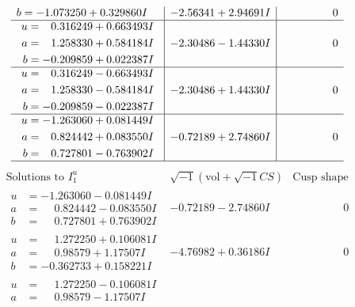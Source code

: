 \documentclass[1p]{elsarticle_modified}
\theoremstyle{definition}
\newcommand{\I}{\sqrt{-1}}
\begin{document}
$$\begin{array}{c|c|c}
\begin{aligned}
b &= -1.073250 + 0.329860 I\end{aligned}
 & -2.56341 + 2.94691 I & \phantom{-0.000000 } 0 \\ \hline\begin{aligned}
u &= \phantom{-}0.316249 + 0.663493 I \\
a &= \phantom{-}1.258330 + 0.584184 I \\
b &= -0.209859 + 0.022387 I\end{aligned}
 & -2.30486 - 1.44330 I & \phantom{-0.000000 } 0 \\ \hline\begin{aligned}
u &= \phantom{-}0.316249 - 0.663493 I \\
a &= \phantom{-}1.258330 - 0.584184 I \\
b &= -0.209859 - 0.022387 I\end{aligned}
 & -2.30486 + 1.44330 I & \phantom{-0.000000 } 0 \\ \hline\begin{aligned}
u &= -1.263060 + 0.081449 I \\
a &= \phantom{-}0.824442 + 0.083550 I \\
b &= \phantom{-}0.727801 - 0.763902 I\end{aligned}
 & -0.72189 + 2.74860 I & \phantom{-0.000000 } 0\\
 \hline 
 \end{array}$$\newpage$$\begin{array}{c|c|c}  
\text{Solutions to }I^u_{1}& \I (\text{vol} + \sqrt{-1}CS) & \text{Cusp shape}\\
 \hline 
\begin{aligned}
u &= -1.263060 - 0.081449 I \\
a &= \phantom{-}0.824442 - 0.083550 I \\
b &= \phantom{-}0.727801 + 0.763902 I\end{aligned}
 & -0.72189 - 2.74860 I & \phantom{-0.000000 } 0 \\ \hline\begin{aligned}
u &= \phantom{-}1.272250 + 0.106081 I \\
a &= \phantom{-}0.98579 + 1.17507 I \\
b &= -0.362733 + 0.158221 I\end{aligned}
 & -4.76982 + 0.36186 I & \phantom{-0.000000 } 0 \\ \hline\begin{aligned}
u &= \phantom{-}1.272250 - 0.106081 I \\
a &= \phantom{-}0.98579 - 1.17507 I \\

\end{aligned}
\end{array}$$
\end{document}
